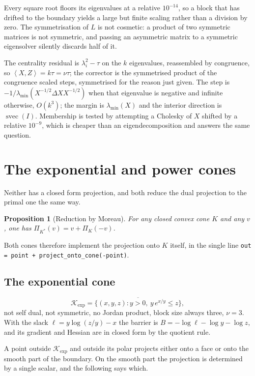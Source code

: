\documentclass[a4paper,11pt]{book}
\theoremstyle{plain}
\newtheorem{proposition}[theorem]{Proposition}
\theoremstyle{definition}
\theoremstyle{remark}
\numberwithin{equation}{chapter}
\numberwithin{algorithm}{chapter}
\newcommand{\proj}[2]{\Pi_{#2}\!\left(#1\right)}
\newcommand{\inner}[2]{\left\langle #1, #2 \right\rangle}
\newcommand{\svec}{\operatorname{svec}}
\newcommand{\Kexp}{\mathcal{K}_{\exp}}
\begin{document}
	Every square root floors its eigenvalues at a relative $10^{-14}$, so a block
	that has drifted to the boundary yields a large but finite scaling rather than
	a division by zero. The symmetrisation of $L$ is not cosmetic: a product of
	two symmetric matrices is not symmetric, and passing an asymmetric matrix to a
	symmetric eigensolver silently discards half of it.

	The centrality residual is $\lambda_i^2-\tau$ on the $k$ eigenvalues,
	reassembled by congruence, so $\inner{X}{Z}=k\tau=\nu\tau$; the corrector is
	the symmetrised product of the congruence scaled steps, symmetrised for the
	reason just given. The step is $-1/\lambda_{\min}(X^{-1/2}\Delta XX^{-1/2})$
	when that eigenvalue is negative and infinite otherwise, $O(k^3)$; the margin
	is $\lambda_{\min}(X)$ and the interior direction is $\svec(I)$. Membership is
	tested by attempting a Cholesky of $X$ shifted by a relative $10^{-9}$, which
	is cheaper than an eigendecomposition and answers the same question.

	\section{The exponential and power cones}

	Neither has a closed form projection, and both reduce the dual projection to
	the primal one the same way.

	\begin{proposition}[Reduction by Moreau]\label{prop:moreaured}
		For any closed convex cone $K$ and any $v$, one has
		$\proj{v}{K^*}=v+\proj{-v}{K}$.
	\end{proposition}


	Both cones therefore implement the projection onto $K$ itself, in the single
	line \texttt{out = point + project\_onto\_cone(-point)}.

	\subsection{The exponential cone}

	\[
	\Kexp=\overline{\bigl\{(x,y,z):y>0,\ y\,e^{x/y}\leq z\bigr\}} ,
	\]
	not self dual, not symmetric, no Jordan product, block size always three,
	$\nu=3$. With the slack $\ell=y\log(z/y)-x$ the barrier is
	$B=-\log\ell-\log y-\log z$, and its gradient and Hessian are in closed form
	by the quotient rule.

	A point outside $\Kexp$ and outside its polar projects either onto a face or
	onto the smooth part of the boundary. On the smooth part the projection is
	determined by a single scalar, and the following says which.
\end{document}
